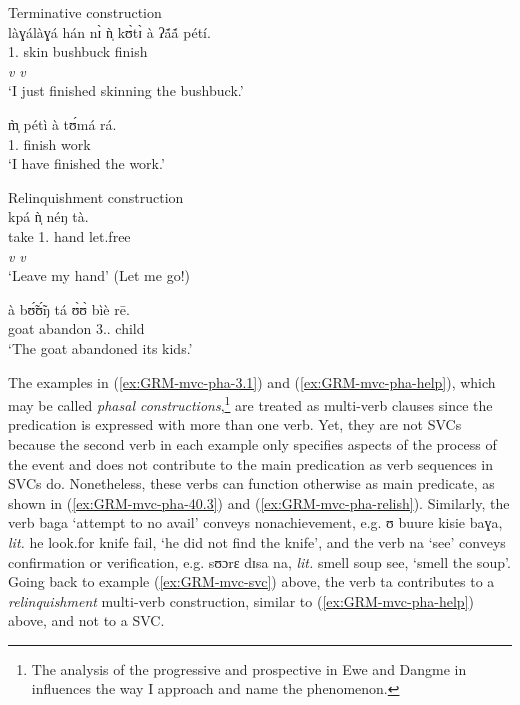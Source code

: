 \ea\label{ex:GRM-mvc-phase}

\ea\label{ex:GRM-mvc-pha-3.1} {\rm Terminative construction}\\
\glll làɣálàɣá hán nɪ̀ ǹ̩ kʊ̀tɪ̀ à ʔã́ã́ pétí.\\
{\advt} {\dem} {\postp} {1.\sg} {skin} {\art} bushbuck  finish\\
{} {} {} {}  {\it v} {} {} {\it v}\\
\glt `I  just finished skinning the bushbuck.'

\ex\label{ex:GRM-mvc-pha-40.3}
\gll  m̩̀ pétì à tʊ́má rá.\\
{1.\sg} finish {\art} work {\foc}\\
\glt `I have finished the work.'


\ex\label{ex:GRM-mvc-pha-help}{\rm Relinquishment construction}\\
\glll  kpá ǹ̩ néŋ tà.\\
take {1.\sg} hand let.free\\
 {\it v} {}  {} {\it v}\\
\glt `Leave my hand' (Let me go!)

\ex\label{ex:GRM-mvc-pha-relish} 
\gll  à bʊ̃́ʊ̃́ŋ tá ʊ̀ʊ̀ bìè rē.\\
{\art} goat abandon {3.\sg.\poss} child {\foc}\\
\glt `The goat abandoned its kids.'

\z 
 \z

The examples  in (\ref{ex:GRM-mvc-pha-3.1}) and (\ref{ex:GRM-mvc-pha-help}),
which may be called  {\it phasal  constructions},\footnote{The analysis of the
progressive and prospective in Ewe and Dangme in \citet{Amek08} influences the
way I approach and name the phenomenon.}  are treated as multi-verb clauses
since the predication is expressed with more than one verb. Yet, they are not
SVCs because the second verb in each example only specifies aspects of the
process
of the event  and does not contribute to the main predication as verb sequences
in SVCs do. Nonetheless, these verbs can function otherwise as main predicate,
as shown in (\ref{ex:GRM-mvc-pha-40.3}) and (\ref{ex:GRM-mvc-pha-relish}).
Similarly, the verb {\sls baga} `attempt to no avail'  conveys
nonachievement, e.g. {\sls ʊ buure kisie baɣa}, {\it lit.} he look.for knife 
fail,
`he did not find the knife',  and the verb {\sls na} `see' conveys confirmation 
or
verification, e.g. {\sls sʊɔrɛ dɪsa na}, {\it lit.} smell soup see, `smell the
soup'. Going back to example (\ref{ex:GRM-mvc-svc}) above, the verb {\sls ta}
contributes to a {\it relinquishment} multi-verb construction, similar to
(\ref{ex:GRM-mvc-pha-help}) above, and not to a SVC. 
 
